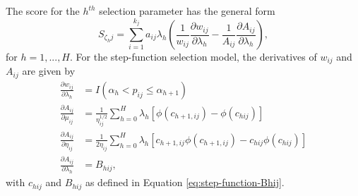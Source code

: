 \documentclass[
  american,
  man, donotrepeattitle,mask,floatsintext]{apa7}
\numberwithin{table}{section}
\numberwithin{equation}{section}
\numberwithin{figure}{section}
\begin{document}
The score for the \(h^{th}\) selection parameter has the general form
\begin{equation}
S_{\zeta_h j} = \sum_{i=1}^{k_j} a_{ij} \lambda_h \left(\frac{1}{w_{ij}}\frac{\partial w_{ij}}{\partial \lambda_{h}} - \frac{1}{A_{ij}}\frac{\partial A_{ij}}{\partial \lambda_{h}}\right),
\end{equation}
for \(h = 1,...,H\).
For the step-function selection model, the derivatives of \(w_{ij}\) and \(A_{ij}\) are given by
\begin{align}
\frac{\partial w_{ij}}{\partial \lambda_h} &= I\left(\alpha_h < p_{ij} \leq \alpha_{h+1}\right) \\
\label{eq:step-function-dAdmu}
\frac{\partial A_{ij}}{\partial \mu_{ij}} &= \frac{1}{\eta_{ij}^{1/2}} \sum_{h=0}^H \lambda_h \left[\phi\left(c_{h+1,ij}\right) - \phi\left(c_{hij}\right)\right] \\
\label{eq:step-function-dAdeta}
\frac{\partial A_{ij}}{\partial \eta_{ij}} &= \frac{1}{2\eta_{ij}} \sum_{h=0}^H \lambda_h \left[c_{h+1,ij} \phi\left(c_{h+1,ij}\right) - c_{hij} \phi\left(c_{hij}\right)\right] \\
\label{eq:step-function-dAdlambda}
\frac{\partial A_{ij}}{\partial \lambda_h} &= B_{hij},
\end{align}
with \(c_{hij}\) and \(B_{hij}\) as defined in Equation \eqref{eq:step-function-Bhij}.
\end{document}
